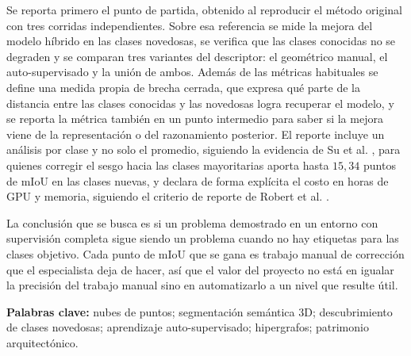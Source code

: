 Se reporta primero el punto de partida, obtenido al reproducir el método original
con tres corridas independientes. Sobre esa referencia se mide la mejora del
modelo híbrido en las clases novedosas, se verifica que las clases conocidas no
se degraden y se comparan tres variantes del descriptor: el geométrico manual, el
auto-supervisado y la unión de ambos. Además de las métricas habituales se define
una medida propia de brecha cerrada, que expresa qué parte de la distancia entre
las clases conocidas y las novedosas logra recuperar el modelo, y se reporta la
métrica también en un punto intermedio para saber si la mejora viene de la
representación o del razonamiento posterior. El reporte incluye un análisis por
clase y no solo el promedio, siguiendo la evidencia de Su et al.
\cite{su2025brdl}, para quienes corregir el sesgo hacia las clases mayoritarias
aporta hasta $15{,}34$ puntos de mIoU en las clases nuevas, y declara de forma
explícita el costo en horas de GPU y memoria, siguiendo el criterio de reporte de
Robert et al. \cite{robert2023spt}.

La conclusión que se busca es si un problema demostrado en un entorno con
supervisión completa sigue siendo un problema cuando no hay etiquetas para las
clases objetivo. Cada punto de mIoU que se gana es trabajo manual de corrección
que el especialista deja de hacer, así que el valor del proyecto no está en
igualar la precisión del trabajo manual sino en automatizarlo a un nivel que
resulte útil.

\vspace{1em}
\noindent\textbf{Palabras clave:} nubes de puntos; segmentación semántica 3D;
descubrimiento de clases novedosas; aprendizaje auto-supervisado; hipergrafos;
patrimonio arquitectónico.
